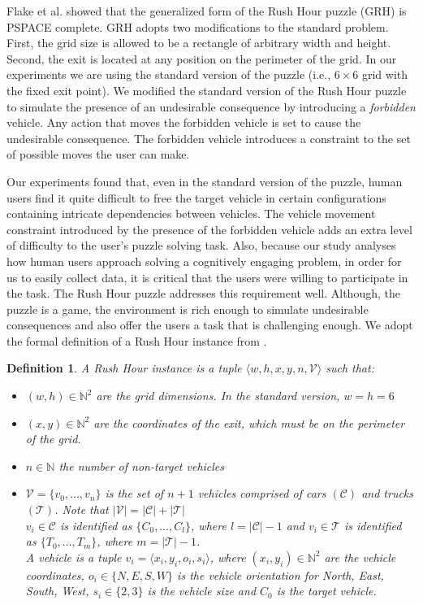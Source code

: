\documentclass[doctor]{thesis} %
\theoremstyle{plain}
\newtheorem{definition}{Definition}
\begin{document}
Flake et al.  showed that the generalized form of the Rush Hour puzzle (GRH) is PSPACE complete. GRH adopts two modifications to the standard problem. First, the grid size is allowed to be a rectangle of arbitrary width and height. Second, the exit is located at any position on the perimeter of the grid. In our experiments we are using the standard version of the puzzle (i.e., $6\times6$ grid with the fixed exit point). We modified the standard version of the Rush Hour puzzle to simulate the presence of an undesirable consequence by introducing a \textit{forbidden} vehicle.  Any action that moves the forbidden vehicle is set to cause the undesirable consequence. The forbidden vehicle introduces a constraint to the set of possible moves the user can make.

Our experiments found that, even in the standard version of the puzzle, human users find it quite difficult to free the target vehicle in certain configurations containing intricate dependencies between vehicles. The vehicle movement constraint introduced by the presence of the forbidden vehicle adds an extra level of difficulty to the user's puzzle solving task. Also, because our study analyses how human users approach solving a cognitively engaging problem, in order for us to easily collect data, it is critical that the users were willing to participate in the task. The Rush Hour puzzle addresses this requirement well. Although, the puzzle is a game, the environment is rich enough to simulate undesirable consequences and also offer the users a task that is challenging enough. We adopt the formal definition of a Rush Hour instance from \cite{flake2002}. 

\begin{definition} 
A Rush Hour instance is a tuple $\langle w,h,x,y,n,\mathcal{V}\rangle$ such that:
\begin{itemize}
\item $(w,h) \in {\mathbb{N}}^2$ are the grid dimensions. In the standard version, $w=h=6$
\item $(x,y) \in {\mathbb{N}}^2$ are the coordinates of the exit, which must be on the perimeter of the grid.
\item $n \in \mathbb{N}$ the number of non-target vehicles
\item $\mathcal{V}=\lbrace v_0, \ldots, v_n \rbrace$ is the set of $n+1$ vehicles comprised of cars $(\mathcal{C})$ and trucks $(\mathcal{T})$. Note that $|\mathcal{V}|=|\mathcal{C}|+|\mathcal{T}|$
\\$v_i \in \mathcal{C}$ is identified as $\lbrace C_0,\ldots,C_l \rbrace$, where $l=|\mathcal{C}|-1$ and $v_i \in \mathcal{T}$ is identified as $\lbrace T_0,\ldots,T_m \rbrace$, where $m=|\mathcal{T}|-1$.
\\A vehicle is a tuple $v_i=\langle x_i,y_i,o_i,s_i \rangle$, where $(x_i,y_i) \in {\mathbb{N}}^2$ are the vehicle coordinates, $o_i \in \lbrace N,E,S,W\rbrace$ is the vehicle orientation for North, East, South, West, $s_i \in \lbrace2,3\rbrace$ is the vehicle size and $C_0$ is the target vehicle.
\end{itemize}
\label{rushdef}
\end{definition}
\end{document}
